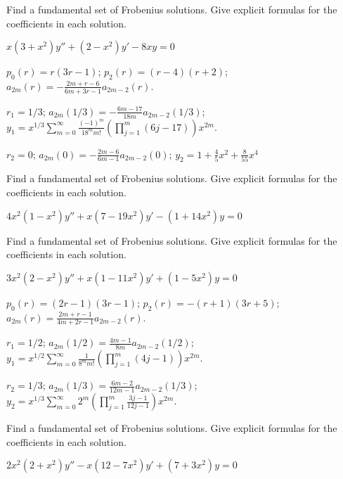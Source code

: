 \documentclass{ximera}
\begin{document}
\begin{problem}\label{exer:7.5.36} 
Find a
fundamental set of Frobenius solutions. Give explicit formulas for
the coefficients in each solution.

$x(3+x^2)y''+(2-x^2)y'-8xy=0$

\begin{solution}
    $p_0(r)=r(3r-1)$;
$p_2(r)=(r-4)(r+2)$;
$a_{2m}(r)=-\frac{2m+r-6}{6m+3r-1}a_{2m-2}(r)$.

$r_1=1/3$;
$a_{2m}(1/3)=-\frac{6m-17}{18m}a_{2m-2}(1/3)$;
$y_1=x^{1/3}\sum_{m=0}^\infty\frac{(-1)^m}{18^mm!}\left(\prod_{j=1}^m
(6j-17)\right) x^{2m}$.

$r_2=0$;
$a_{2m}(0)=-\frac{2m-6}{6m-1}a_{2m-2}(0)$;
$y_2=1+\frac{4}{5}x^2+\frac{8}{55}x^4$
\end{solution}
\end{problem}

\begin{problem}\label{exer:7.5.37} 
Find a
fundamental set of Frobenius solutions. Give explicit formulas for
the coefficients in each solution.

$4x^2(1-x^2)y''+x(7-19x^2)y'-(1+14x^2)y=0$
\end{problem}

\begin{problem}\label{exer:7.5.38} 
Find a
fundamental set of Frobenius solutions. Give explicit formulas for
the coefficients in each solution.

$3x^2(2-x^2)y''+x(1-11x^2)y'+(1-5x^2)y=0$

\begin{solution}
    $p_0(r)=(2r-1)(3r-1)$;
$p_2(r)=-(r+1)(3r+5)$;
$a_{2m}(r)=\frac{2m+r-1}{4m+2r-1}a_{2m-2}(r)$.

$r_1=1/2$;
$a_{2m}(1/2)=\frac{4m-1}{8m}a_{2m-2}(1/2)$;
$y_1=x^{1/2}\sum_{m=0}^\infty\frac{1}{8^mm!}\left(\prod_{j=1}^m(4j-1)
 \right)x^{2m}$.

$r_2=1/3$;
$a_{2m}(1/3)=\frac{6m-2}{12m-1}a_{2m-2}(1/3)$;
$y_2=x^{1/3}\sum_{m=0}^\infty2^m\left(\prod_{j=1}^m\frac{3j-1}{12j-1}
\right) x^{2m}$.
\end{solution}
\end{problem}

\begin{problem}\label{exer:7.5.39} 
Find a
fundamental set of Frobenius solutions. Give explicit formulas for
the coefficients in each solution.

$2x^2(2+x^2)y''-x(12-7x^2)y'+(7+3x^2)y=0$
\end{problem}
\end{document}
